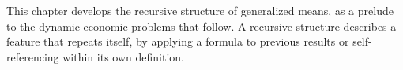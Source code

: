 This chapter develops the recursive structure of generalized means, as a prelude to the dynamic economic problems that follow. A recursive structure describes a feature that repeats itself, by applying a formula to previous results or self-referencing within its own definition.














